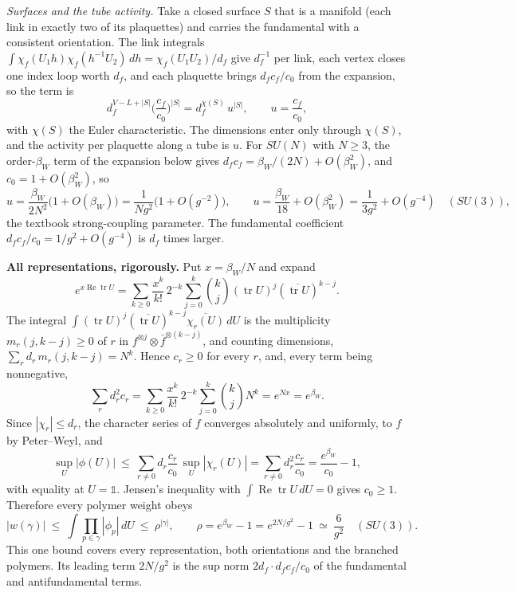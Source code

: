 \documentclass[11pt,a4paper]{article}
\begin{document}
\emph{Surfaces and the tube activity.} Take a closed surface \(S\) that
is a manifold (each link in exactly two of its plaquettes) and carries
the fundamental with a consistent orientation. The link integrals
\(\int\chi_f(U_1h)\chi_f(h^{-1}U_2)\,dh=\chi_f(U_1U_2)/d_f\) give
\(d_f^{-1}\) per link, each vertex closes one index loop worth \(d_f\),
and each plaquette brings \(d_fc_f/c_0\) from the expansion, so the term
is
\[d_f^{V-L+|S|}\Big(\frac{c_f}{c_0}\Big)^{|S|}=d_f^{\chi(S)}\,u^{|S|},
\qquad u=\frac{c_f}{c_0},\] with \(\chi(S)\) the Euler characteristic.
The dimensions enter only through \(\chi(S)\), and the activity per
plaquette along a tube is \(u\). For \(SU(N)\) with \(N\ge3\), the
order-\(\beta_W\) term of the expansion below gives
\(d_fc_f=\beta_W/(2N)+O(\beta_W^2)\), and \(c_0=1+O(\beta_W^2)\), so
\[u=\frac{\beta_W}{2N^2}\big(1+O(\beta_W)\big)=\frac{1}{Ng^2}\big(1+O(g^{-2})\big),
\qquad u=\frac{\beta_W}{18}+O(\beta_W^2)=\frac1{3g^2}+O(g^{-4})\quad(SU(3)),\]
the textbook strong-coupling parameter. The fundamental coefficient
\(d_fc_f/c_0=1/g^2+O(g^{-4})\) is \(d_f\) times larger.

\textbf{All representations, rigorously.} Put \(x=\beta_W/N\) and expand
\[e^{x\operatorname{Re}\operatorname{tr}U}=\sum_{k\ge0}\frac{x^k}{k!}\,2^{-k}\sum_{j=0}^k\binom kj(\operatorname{tr}U)^j(\overline{\operatorname{tr}U})^{k-j}.\]
The integral
\(\int(\operatorname{tr}U)^j(\overline{\operatorname{tr}U})^{k-j}\overline{\chi_r(U)}\,dU\)
is the multiplicity \(m_r(j,k-j)\ge0\) of \(r\) in
\(f^{\otimes j}\otimes\bar f^{\otimes(k-j)}\), and counting dimensions,
\(\sum_rd_r\,m_r(j,k-j)=N^k\). Hence \(c_r\ge0\) for every \(r\), and,
every term being nonnegative,
\[\sum_rd_r^2c_r=\sum_{k\ge0}\frac{x^k}{k!}\,2^{-k}\sum_{j=0}^k\binom kjN^k=e^{Nx}=e^{\beta_W}.\]
Since \(|\chi_r|\le d_r\), the character series of \(f\) converges
absolutely and uniformly, to \(f\) by Peter--Weyl, and
\[\sup_U|\phi(U)|\ \le\ \sum_{r\ne0}d_r\frac{c_r}{c_0}\,\sup_U|\chi_r(U)|
=\sum_{r\ne0}d_r^2\frac{c_r}{c_0}=\frac{e^{\beta_W}}{c_0}-1,\] with
equality at \(U=\mathbb 1\). Jensen's inequality with
\(\int\operatorname{Re}\operatorname{tr}U\,dU=0\) gives \(c_0\ge1\).
Therefore every polymer weight obeys
\[|w(\gamma)|\ \le\ \int\prod_{p\in\gamma}|\phi_p|\,dU\ \le\ \rho^{|\gamma|},
\qquad\rho=e^{\beta_W}-1=e^{2N/g^2}-1\ \simeq\ \frac{6}{g^2}\quad(SU(3)).\]
This one bound covers every representation, both orientations and the
branched polymers. Its leading term \(2N/g^2\) is the sup norm
\(2d_f\cdot d_fc_f/c_0\) of the fundamental and antifundamental terms.
\end{document}
